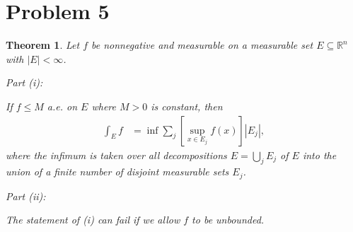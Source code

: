 \documentclass[10pt,a4paper]{article}
\makeatletter
\theoremstyle{theorem}
\newtheorem{theorem}{Theorem}
\newcommand{\proofpart}[2]{%
  \par
  \addvspace{\medskipamount}%
  \noindent\emph{Part #1: #2}\par\nobreak
  \addvspace{\smallskipamount}%
  \@afterheading
}
\theoremstyle{definition}
\makeatother
\begin{document}
\section*{Problem 5}
\begin{theorem}
Let $f$ be nonnegative and measurable on a measurable set $E \subseteq \mathbb{R}^n$ with $|E| < \infty$.
\proofpart{(i)}{} 
If $f \leq M$ a.e. on $E$ where $M > 0$ is constant, then
\begin{align*}
\int_E f &= \inf \sum_j [\sup_{x \in E_j} f(x)] |E_j|,
\end{align*}
where the infimum is taken over all decompositions $E = \bigcup_j E_j$ of $E$ into the union of a finite number of disjoint measurable sets $E_j$.

\proofpart{(ii)}{} The statement of (i) can fail if we allow $f$ to be unbounded.
\end{theorem}
\end{document}

